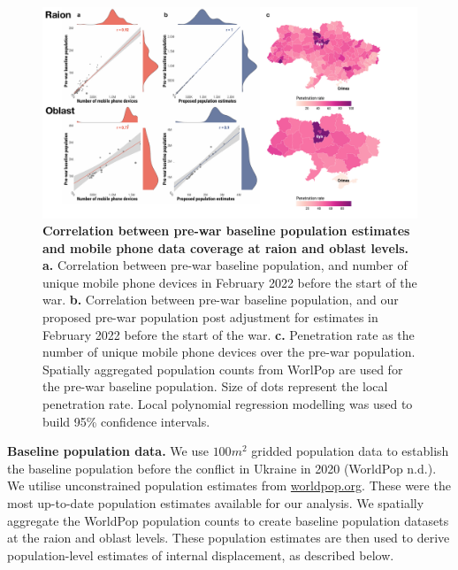 \documentclass[
  sn-nature,
  11pt,
]{sn-jnl}
\begin{document}
\begin{figure}

\begin{minipage}{\linewidth}

\includegraphics[width=\linewidth,height=0.8\textheight,keepaspectratio]{../outputs/2_4/mp-data-coverage.pdf}

\end{minipage}%

\caption{\label{fig-data-coverage}\textbf{Correlation between pre-war
baseline population estimates and mobile phone data coverage at raion
and oblast levels.} \textbf{a.} Correlation between pre-war baseline
population, and number of unique mobile phone devices in February 2022
before the start of the war. \textbf{b.} Correlation between pre-war
baseline population, and our proposed pre-war population post adjustment
for estimates in February 2022 before the start of the war. \textbf{c.}
Penetration rate as the number of unique mobile phone devices over the
pre-war population. Spatially aggregated population counts from WorlPop
are used for the pre-war baseline population. Size of dots represent the
local penetration rate. Local polynomial regression modelling was used
to build 95\% confidence intervals.}

\end{figure}%

\textbf{Baseline population data.} We use \(100m^{2}\) gridded
population data to establish the baseline population before the conflict
in Ukraine in 2020 (WorldPop n.d.). We utilise unconstrained population
estimates from \href{https://www.worldpop.org/}{worldpop.org}. These
were the most up-to-date population estimates available for our
analysis. We spatially aggregate the WorldPop population counts to
create baseline population datasets at the raion and oblast levels.
These population estimates are then used to derive population-level
estimates of internal displacement, as described below.
\end{document}
